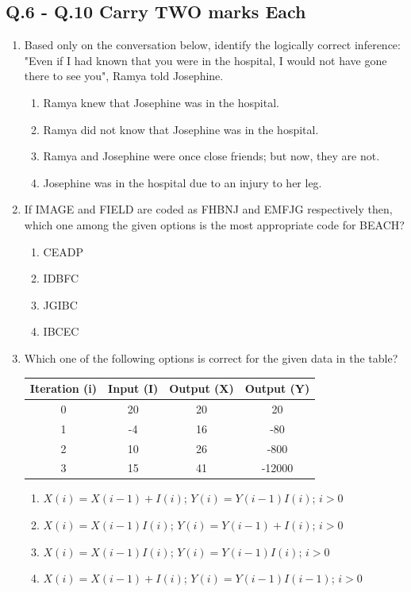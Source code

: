\documentclass[journal]{IEEEtran}
\theoremstyle{remark}
\begin{document}
\subsection*{Q.6 - Q.10 Carry TWO marks Each}
\begin{enumerate}[resume]
\item Based only on the conversation below, identify the logically correct inference: \hfill{} \\
"Even if I had known that you were in the hospital, I would not have gone there to see you", Ramya told Josephine.
\begin{enumerate}
    \item Ramya knew that Josephine was in the hospital.
    \item Ramya did not know that Josephine was in the hospital.
    \item Ramya and Josephine were once close friends; but now, they are not.
    \item Josephine was in the hospital due to an injury to her leg.
\end{enumerate}

\item If IMAGE and FIELD are coded as FHBNJ and EMFJG respectively then, which one among the given options is the most appropriate code for BEACH? \hfill{}
\begin{multicols}{4}
\begin{enumerate}
\item CEADP
\item IDBFC
\item JGIBC
\item IBCEC
\end{enumerate}
\end{multicols}

\item Which one of the following options is correct for the given data in the table? \hfill{}
\begin{center}
\begin{tabular}{|c|c|c|c|}
\hline
\textbf{Iteration (i)} & \textbf{Input (I)} & \textbf{Output (X)} & \textbf{Output (Y)} \\
\hline
0 & 20 & 20 & 20 \\
\hline
1 & -4 & 16 & -80 \\
\hline
2 & 10 & 26 & -800 \\
\hline
3 & 15 & 41 & -12000 \\
\hline
\end{tabular}
\end{center}
\begin{enumerate}
\item $X(i)=X(i-1)+I(i)$; $Y(i)=Y(i-1)I(i)$; $i>0$
\item $X(i)=X(i-1)I(i)$; $Y(i)=Y(i-1)+I(i)$; $i>0$
\item $X(i)=X(i-1)I(i)$; $Y(i)=Y(i-1)I(i)$; $i>0$
\item $X(i)=X(i-1)+I(i)$; $Y(i)=Y(i-1)I(i-1)$; $i>0$
\end{enumerate}


\end{enumerate}
\end{document}
